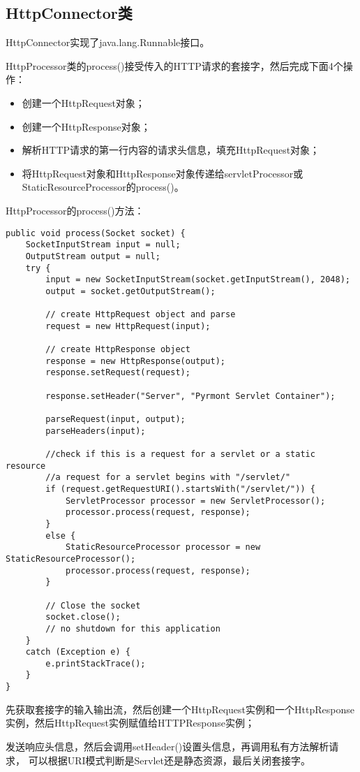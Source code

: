 \subsection{HttpConnector类}
HttpConnector实现了java.lang.Runnable接口。
\par HttpProcessor类的process()接受传入的HTTP请求的套接字，然后完成下面4个操作：
\begin{itemize}
	\item 创建一个HttpRequest对象；
	\item 创建一个HttpResponse对象；
	\item 解析HTTP请求的第一行内容的请求头信息，填充HttpRequest对象；
	\item 将HttpRequest对象和HttpResponse对象传递给servletProcessor或
	StaticResourceProcessor的process()。
\end{itemize}
HttpProcessor的process()方法：
\begin{lstlisting}
public void process(Socket socket) {
	SocketInputStream input = null;
	OutputStream output = null;
	try {
		input = new SocketInputStream(socket.getInputStream(), 2048);
		output = socket.getOutputStream();
		
		// create HttpRequest object and parse
		request = new HttpRequest(input);
		
		// create HttpResponse object
		response = new HttpResponse(output);
		response.setRequest(request);
		
		response.setHeader("Server", "Pyrmont Servlet Container");
		
		parseRequest(input, output);
		parseHeaders(input);
		
		//check if this is a request for a servlet or a static resource
		//a request for a servlet begins with "/servlet/"
		if (request.getRequestURI().startsWith("/servlet/")) {
			ServletProcessor processor = new ServletProcessor();
			processor.process(request, response);
		}
		else {
			StaticResourceProcessor processor = new StaticResourceProcessor();
			processor.process(request, response);
		}
		
		// Close the socket
		socket.close();
		// no shutdown for this application
	}
	catch (Exception e) {
		e.printStackTrace();
	}
}
\end{lstlisting}
\par 先获取套接字的输入输出流，然后创建一个HttpRequest实例和一个HttpResponse实例，然后HttpRequest实例赋值给HTTPResponse实例；
\par 发送响应头信息，然后会调用setHeader()设置头信息，再调用私有方法解析请求，
可以根据URI模式判断是Servlet还是静态资源，最后关闭套接字。

